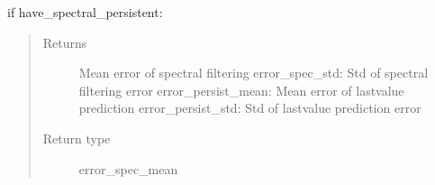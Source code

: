 \documentclass[letterpaper,10pt,english]{sphinxmanual}
\begin{document}
\begin{fulllineitems}
\label{\detokenize{LDS:LDS.OnlineLDS_library.error_stat}}
\sphinxAtStartPar
if have\_spectral\_persistent:
\begin{quote}\begin{description}
\item[{Returns}] \leavevmode
\sphinxAtStartPar
Mean error of spectral filtering
error\_spec\_std:     Std of spectral filtering error
error\_persist\_mean: Mean error of last\sphinxhyphen{}value prediction
error\_persist\_std:  Std of last\sphinxhyphen{}value prediction error

\item[{Return type}] \leavevmode
\sphinxAtStartPar
error\_spec\_mean

\end{description}\end{quote}

\end{fulllineitems}

\end{document}
